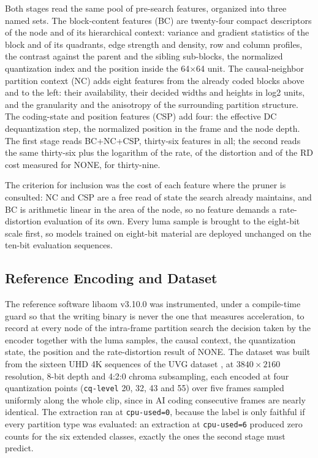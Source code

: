 \documentclass[conference]{IEEEtran}
\begin{document}
Both stages read the same pool of pre-search features, organized into three named
sets. The block-content features (BC) are twenty-four compact descriptors of the
node and of its hierarchical context: variance and gradient statistics of the
block and of its quadrants, edge strength and density, row and column profiles,
the contrast against the parent and the sibling sub-blocks, the normalized
quantization index and the position inside the 64$\times$64 unit. The
causal-neighbor partition context (NC) adds eight features from the already coded
blocks above and to the left: their availability, their decided widths and
heights in log2 units, and the granularity and the anisotropy of the surrounding
partition structure. The coding-state and position features (CSP) add four: the
effective DC dequantization step, the normalized position in the frame and the
node depth. The first stage reads BC+NC+CSP, thirty-six features in all; the
second reads the same thirty-six plus the logarithm of the rate, of the
distortion and of the RD cost measured for NONE, for thirty-nine.

The criterion for inclusion was the cost of each feature where the pruner is
consulted: NC and CSP are a free read of state the search already maintains, and
BC is arithmetic linear in the area of the node, so no feature demands a
rate-distortion evaluation of its own. Every luma sample is brought to the
eight-bit scale first, so models trained on eight-bit material are deployed
unchanged on the ten-bit evaluation sequences.

\subsection{Reference Encoding and Dataset}
\label{sec_data}

The reference software libaom v3.10.0 was instrumented, under a compile-time
guard so that the writing binary is never the one that measures acceleration, to
record at every node of the intra-frame partition search the decision taken by
the encoder together with the luma samples, the causal context, the quantization
state, the position and the rate-distortion result of NONE. The dataset was built
from the sixteen UHD 4K sequences of the UVG dataset \cite{uvg}, at
$3840\times2160$ resolution, 8-bit depth and 4:2:0 chroma subsampling, each
encoded at four quantization points (\texttt{cq-level} 20, 32, 43 and 55) over
five frames sampled uniformly along the whole clip, since in AI coding
consecutive frames are nearly identical. The extraction ran at
\texttt{cpu-used=0}, because the label is only faithful if every partition type
was evaluated: an extraction at \texttt{cpu-used=6} produced zero counts for the
six extended classes, exactly the ones the second stage must predict.
\end{document}
